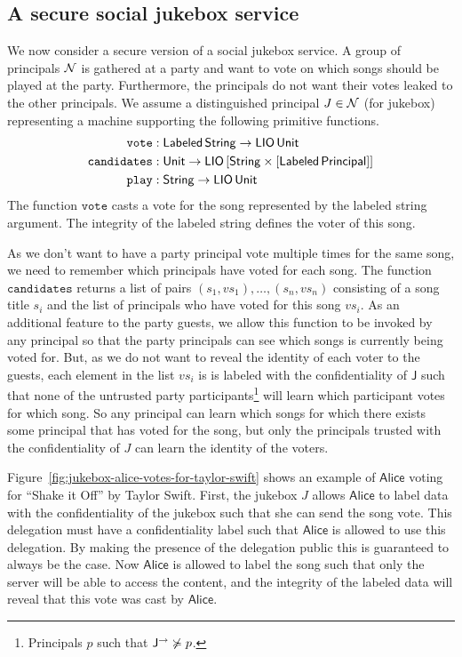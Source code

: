 \subsection{A secure social jukebox service}
We now consider a secure version of a social jukebox service. A group of principals $\mathcal{N}$ is gathered at a party and want to vote on which songs should be played at the party. Furthermore, the principals do not want their votes leaked to the other principals. We assume a distinguished principal $J \in \mathcal{N}$ (for jukebox) representing a machine supporting the following primitive functions.
\begin{align*}
\mathtt{vote}&: \mathsf{Labeled}\,\mathsf{String} \to \mathsf{LIO}\,\mathsf{Unit}\\
\mathtt{candidates}&: \mathsf{Unit} \to \mathsf{LIO}\,\lbrack\mathsf{String} \times \lbrack\mathsf{Labeled}\,\mathsf{Principal}\rbrack\rbrack\\
\mathtt{play}&: \mathsf{String} \to \mathsf{LIO}\,\mathsf{Unit}
\end{align*}
The function $\mathtt{vote}$ casts a vote for the song represented by the labeled string argument. The integrity of the labeled string defines the voter of this song.

As we don't want to have a party principal vote multiple times for the same song, we need to remember which principals have voted for each song. The function $\mathtt{candidates}$ returns a list of pairs $(s_1, \mathit{vs}_1), \dots, (s_n, {\mathit{vs}}_n)$ consisting of a song title $s_i$ and the list of principals who have voted for this song $\mathit{vs}_i$. As an additional feature to the party guests, we allow this function to be invoked by any principal so that the party principals can see which songs is currently being voted for. But, as we do not want to reveal the identity of each voter to the guests, each element in the list $\mathit{vs}_i$ is is labeled with the confidentiality of $\mathsf{J}$ such that none of the untrusted party participants\footnote{Principals $p$ such that $\mathsf{J}^{\rightarrow} \not\succcurlyeq p$.} will learn which participant votes for which song. So any principal can learn which songs for which there exists some principal that has voted for the song, but only the principals trusted with the confidentiality of $J$ can learn the identity of the voters.

Figure~\ref{fig:jukebox-alice-votes-for-taylor-swift} shows an example of $\mathsf{Alice}$ voting for ``Shake it Off'' by Taylor Swift. First, the jukebox $J$ allows $\mathsf{Alice}$ to label data with the confidentiality of the jukebox such that she can send the song vote. This delegation must have a confidentiality label such that $\mathsf{Alice}$ is allowed to use this delegation. By making the presence of the delegation public this is guaranteed to always be the case. Now $\mathsf{Alice}$ is allowed to label the song such that only the server will be able to access the content, and the integrity of the labeled data will reveal that this vote was cast by $\mathsf{Alice}$.

